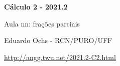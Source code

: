 \documentclass[oneside,12pt]{article}
\begin{document}
%



\def\u#1{\par{\footnotesize \url{#1}}}

\def\drafturl{http://angg.twu.net/LATEX/2021-2-C2.pdf}
\def\drafturl{http://angg.twu.net/2021.2-C2.html}
\def\draftfooter{\tiny \href{\drafturl}{\jobname{}} \ColorBrown{\shorttoday{} \hours}}

\def\together   {\mathsf{together}}
\def\togetherp#1{\mathsf{together}\left(#1\right)}
\def\apart   {\mathsf{apart}}



%

\thispagestyle{empty}

\begin{center}

\vspace*{1.2cm}

{\bf \Large Cálculo 2 - 2021.2}

\bsk

Aula nn: frações parciais

\bsk

Eduardo Ochs - RCN/PURO/UFF

\url{http://angg.twu.net/2021.2-C2.html}

\end{center}

\newpage





\end{document}
